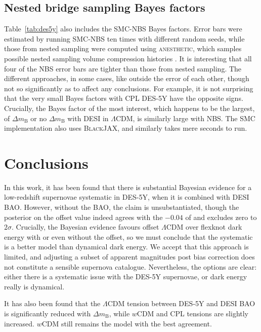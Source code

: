 \documentclass[fleqn,usenatbib]{mnras}
\newcommand{\lcdm}{$\Lambda$CDM}
\newcommand{\dmb}{\ensuremath{\Delta m_\mathrm B}}
\begin{document}
    \subsection{Nested bridge sampling Bayes factors}

    Table~\ref{tab:des5y} also includes the SMC-NBS Bayes factors.
    Error bars were estimated by running SMC-NBS ten times with different random seeds, while those from nested sampling were computed using \textsc{anesthetic}, which samples possible nested sampling volume compression histories \citep{anesthetic}.
    It is interesting that all four of the NBS error bars are tighter than those from nested sampling.
    The different approaches, in some cases, like outside the error of each other, though not so significantly as to affect any conclusions.
    For example, it is not surprising that the very small Bayes factors with CPL DES-5Y have the opposite signs.
    Crucially, the Bayes factor of the most interest, which happens to be the largest, of \dmb{} or no \dmb{} with DESI in \lcdm, is similarly large with NBS.
    The SMC implementation also uses \textsc{BlackJAX}, and similarly takes mere seconds to run.
    
    \section{Conclusions}\label{sec:conclusions}

    In this work, it has been found that there is substantial Bayesian evidence for a low-redshift supernovae systematic in DES-5Y, when it is combined with DESI BAO.
    However, without the BAO, the claim is unsubstantiated, though the posterior on the offset value indeed agrees with the $-0.04$ of \citet{georgedes5y} and excludes zero to $2\sigma$.
    Crucially, the Bayesian evidence favours offset \lcdm{} over flexknot dark energy with or even without the offset, so we must conclude that the systematic is a better model than dynamical dark energy.
    We accept that this approach is limited, and adjusting a subset of apparent magnitudes post bias correction does not constitute a sensible supernova catalogue.
    Nevertheless, the options are clear: either there is a systematic issue with the DES-5Y supernovae, or dark energy really is dynamical.

    It has also been found that the \lcdm{} tension between DES-5Y and DESI BAO is significantly reduced with \dmb{}, while $w$CDM and CPL tensions are slightly increased.
    $w$CDM still remains the model with the best agreement.
\end{document}
